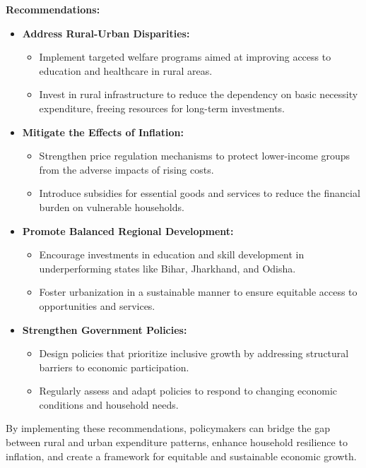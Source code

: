 \documentclass{article}
\begin{document}
	\textbf{Recommendations:}  
	\begin{itemize}
		\item \textbf{Address Rural-Urban Disparities:} 
		\begin{itemize}
			\item Implement targeted welfare programs aimed at improving access to education and healthcare in rural areas.
			\item Invest in rural infrastructure to reduce the dependency on basic necessity expenditure, freeing resources for long-term investments.
		\end{itemize}
		
		\item \textbf{Mitigate the Effects of Inflation:}
		\begin{itemize}
			\item Strengthen price regulation mechanisms to protect lower-income groups from the adverse impacts of rising costs.
			\item Introduce subsidies for essential goods and services to reduce the financial burden on vulnerable households.
		\end{itemize}
		
		\item \textbf{Promote Balanced Regional Development:}
		\begin{itemize}
			\item Encourage investments in education and skill development in underperforming states like Bihar, Jharkhand, and Odisha.
			\item Foster urbanization in a sustainable manner to ensure equitable access to opportunities and services.
		\end{itemize}
		
		\item \textbf{Strengthen Government Policies:}
		\begin{itemize}
			\item Design policies that prioritize inclusive growth by addressing structural barriers to economic participation.
			\item Regularly assess and adapt policies to respond to changing economic conditions and household needs.
		\end{itemize}
	\end{itemize}
	
	By implementing these recommendations, policymakers can bridge the gap between rural and urban expenditure patterns, enhance household resilience to inflation, and create a framework for equitable and sustainable economic growth.
	
\end{document}
